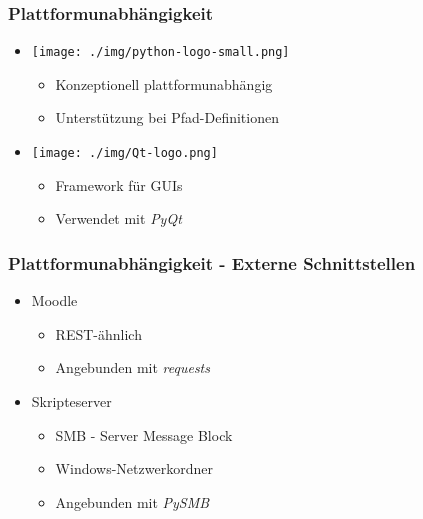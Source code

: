\documentclass{beamer}
\begin{document}
	\begin{frame}
	\frametitle{Plattformunabhängigkeit}
	
	\begin{itemize}
	  \item[]
	    \texttt{[image: ./img/python-logo-small.png]}
	    \begin{itemize}
	      \item Konzeptionell plattformunabhängig
	      \item Unterstützung bei Pfad-Definitionen
	    \end{itemize}
      \vspace{1em}
	  \item[]
	    \texttt{[image: ./img/Qt-logo.png]}
	    \begin{itemize}
	      \item Framework für GUIs
	      \item Verwendet mit \emph{PyQt}
	    \end{itemize}
	\end{itemize}
	\end{frame}

  \begin{frame}
    \frametitle{Plattformunabhängigkeit - Externe Schnittstellen}

    \begin{itemize}
      \item Moodle
        \begin{itemize}
          \item REST-ähnlich
          \item Angebunden mit \emph{requests}
        \end{itemize}
      \item Skripteserver
        \begin{itemize}
          \item SMB - Server Message Block
          \item Windows-Netzwerkordner
          \item Angebunden mit \emph{PySMB}
        \end{itemize}
    \end{itemize}
  \end{frame}
\end{document}

